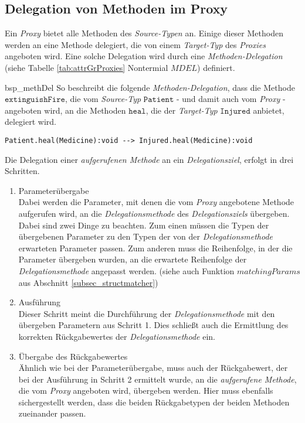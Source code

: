\subsection{Delegation von Methoden im Proxy}
Ein \emph{Proxy} bietet alle Methoden des \emph{Source-Typen} an. Einige dieser Methoden werden an eine Methode delegiert, die von einem \emph{Target-Typ} des \emph{Proxies} angeboten wird. Eine solche Delegation wird durch eine \emph{Methoden-Delegation} (siehe Tabelle \ref{tab:attrGrProxies} Nontermial $\mathit{MDEL}$) definiert.
\begin{example}{bsp_methDel}
So beschreibt die folgende \emph{Methoden-Delegation}, dass die Methode $\texttt{extinguishFire}$, die vom \emph{Source-Typ} $\texttt{Patient}$ - und damit auch vom \emph{Proxy} - angeboten wird, an die Methoden $\texttt{heal}$, die der \emph{Target-Typ} $\texttt{Injured}$ anbietet, delegiert wird.
\begin{lstlisting}[style = dsl, caption = Einfache Methoden-Delegation, captionpos = b]
	Patient.heal(Medicine):void --> Injured.heal(Medicine):void
\end{lstlisting}
\end{example}
Die Delegation einer \emph{aufgerufenen Methode} an ein \emph{Delegationsziel}, erfolgt in drei Schritten.
\begin{enumerate}
\item Parameterübergabe\\
Dabei werden die Parameter, mit denen die vom \emph{Proxy} angebotene Methode aufgerufen wird, an die \emph{Delegationsmethode} des \emph{Delegationsziels} übergeben. Dabei sind zwei Dinge zu beachten. Zum einen müssen die Typen der übergebenen Parameter zu den Typen der von der \emph{Delegationsmethode} erwarteten Parameter passen. Zum anderen muss die Reihenfolge, in der die Parameter übergeben wurden, an die erwartete Reihenfolge der \emph{Delegationsmethode} angepasst werden. (siehe auch Funktion $\mathit{matchingParams}$ aus Abschnitt \ref{subsec_structmatcher})
\item Ausführung\\
Dieser Schritt meint die Durchführung der \emph{Delegationsmethode} mit den übergeben Parametern aus Schritt 1. Dies schließt auch die Ermittlung des korrekten Rückgabewertes der \emph{Delegationsmethode} ein.
\item Übergabe des Rückgabewertes\\
Ähnlich wie bei der Parameterübergabe, muss auch der Rückgabewert, der bei der Ausführung in Schritt 2 ermittelt wurde, an die \emph{aufgerufene Methode}, die vom \emph{Proxy} angeboten wird, übergeben werden. Hier muss ebenfalls sichergestellt werden, dass die beiden Rückgabetypen der beiden Methoden zueinander passen.
\end{enumerate}
